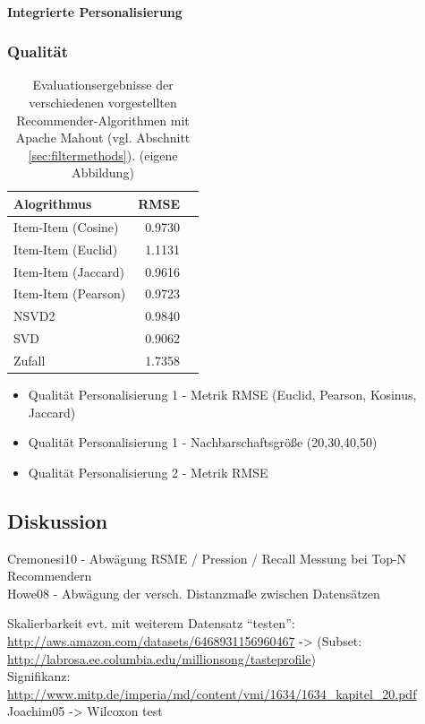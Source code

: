 \paragraph{Integrierte Personalisierung}

\subsubsection{Qualität}

\begin{table}
  \centering
  \begin{tabular}{ l | r  r  }
  Alogrithmus & RMSE \\ \hline
  Item-Item (Cosine) & 0.9730 \\ 
  Item-Item (Euclid) & 1.1131 \\   
  Item-Item (Jaccard) & 0.9616 \\
  Item-Item (Pearson) & 0.9723 \\ \hline
  NSVD2 & 0.9840  \\
  SVD &	0.9062 \\ \hline
  Zufall &	1.7358
  \end{tabular}
  \caption{\footnotesize Evaluationsergebnisse der verschiedenen vorgestellten Recommender-Algorithmen mit Apache Mahout  (vgl. Abschnitt \ref{sec:filtermethods}). { \scriptsize (eigene Abbildung)}}
  \label{tab:rmse-eval}
\end{table}

\begin{itemize}
\item Qualität Personalisierung 1 - Metrik RMSE (Euclid, Pearson, Kosinus, Jaccard)
\item Qualität Personalisierung 1 - Nachbarschaftsgröße (20,30,40,50)
\item Qualität Personalisierung 2 - Metrik RMSE
\end{itemize}

\subsection{Diskussion}

Cremonesi10 - Abwägung RSME / Pression / Recall Messung bei Top-N Recommendern \\
Howe08 - Abwägung der versch. Distanzmaße zwischen Datensätzen

Skalierbarkeit evt. mit weiterem Datensatz ``testen'': \\
\url{http://aws.amazon.com/datasets/6468931156960467} -> (Subset: \url{http://labrosa.ee.columbia.edu/millionsong/tasteprofile}) \\

Signifikanz: \url{http://www.mitp.de/imperia/md/content/vmi/1634/1634_kapitel_20.pdf} \\
Joachim05 -> Wilcoxon test